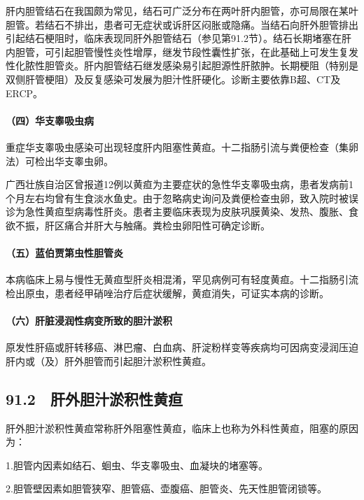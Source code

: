 肝内胆管结石在我国颇为常见，结石可广泛分布在两叶肝内胆管，亦可局限在某叶胆管。若结石不排出，患者可无症状或诉肝区闷胀或隐痛。当结石向肝外胆管排出引起结石梗阻时，临床表现同肝外胆管结石（参见第91.2节）。结石长期堵塞在肝内胆管，可引起胆管慢性炎性增厚，继发节段性囊性扩张，在此基础上可发生复发性化脓性胆管炎。肝内胆管结石继发感染易引起胆源性肝脓肿。长期梗阻（特别是双侧肝管梗阻）及反复感染可发展为胆汁性肝硬化。诊断主要依靠B超、CT及ERCP。

\paragraph{（四）华支睾吸虫病}

重症华支睾吸虫感染可出现轻度肝内阻塞性黄疸。十二指肠引流与粪便检查（集卵法）可检出华支睾虫卵。

广西壮族自治区曾报道12例以黄疸为主要症状的急性华支睾吸虫病，患者发病前1个月左右均曾有生食淡水鱼史。由于忽略病史询问及粪便检查虫卵，致入院时被误诊为急性黄疸型病毒性肝炎。患者主要临床表现为皮肤巩膜黄染、发热、腹胀、食欲不振，肝区痛合并肝大与触痛。粪检虫卵阳性可确定诊断。

\paragraph{（五）蓝伯贾第虫性胆管炎}

本病临床上易与慢性无黄疸型肝炎相混淆，罕见病例可有轻度黄疸。十二指肠引流检出原虫，患者经甲硝唑治疗后症状缓解，黄疸消失，可证实本病的诊断。

\paragraph{（六）肝脏浸润性病变所致的胆汁淤积}

原发性肝癌或肝转移癌、淋巴瘤、白血病、肝淀粉样变等疾病均可因病变浸润压迫肝内或（及）肝外胆管而引起胆汁淤积性黄疸。

\protect\hypertarget{text00217.html}{}{}

\subsection{91.2　肝外胆汁淤积性黄疸}

肝外胆汁淤积性黄疸常称肝外阻塞性黄疸，临床上也称为外科性黄疸，阻塞的原因为：

1.胆管内因素如结石、蛔虫、华支睾吸虫、血凝块的堵塞等。

2.胆管壁因素如胆管狭窄、胆管癌、壶腹癌、胆管炎、先天性胆管闭锁等。

